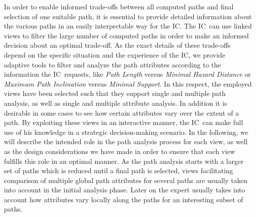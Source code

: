 \documentclass[conference,10pt,letter]{IEEEtran}
\def\IC{IC}
\begin{document}
In order to enable informed trade-offs between all computed paths and final selection of one suitable path, it is essential to provide detailed information about the various paths in an easily interpretable way for the \IC . The \IC\ can use linked views to filter the large number of computed paths in order to make an informed decision about an optimal trade-off. As the exact details of these trade-offs depend on the specific situation and the experience of the \IC, we provide adaptive tools to filter and analyze the path attributes according to the information the \IC\ requests, like \emph{Path Length} versus \emph{Minimal Hazard Distance} or \emph{Maximum Path Inclination} versus \emph{Minimal Support}. In this respect, the employed views have been selected such that they support single and multiple path analysis, as well as single and multiple attribute analysis. In addition it is desirable in some cases to see how certain attributes vary over the extent of a path. By exploiting these views in an interactive manner, the \IC\ can make full use of his knowledge in a strategic decision-making scenario. In the following, we will describe the intended role in the path analysis process for each view, as well as the design considerations we have made in order to ensure that each view fulfills this role in an optimal manner. As the path analysis starts with a larger set of paths which is reduced until a final path is selected, views facilitating comparison of multiple global path attributes for several paths are usually taken into account in the initial analysis phase. Later on the expert usually takes into account how attributes vary locally along the paths for an interesting subset of paths.
\end{document}
